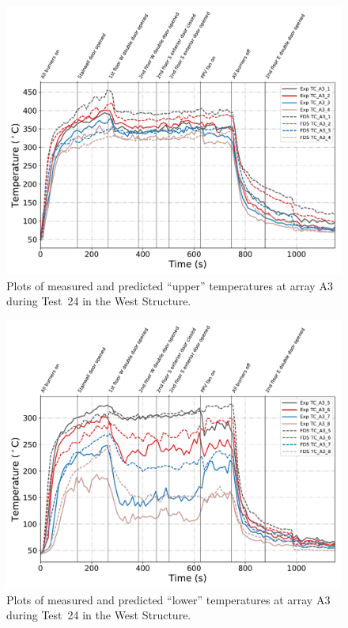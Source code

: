 \begin{figure}[!h]
	\centering
	\includegraphics[width=\columnwidth]{Figures/Plots/Validation/Temperature/Test_24_TC_A3_upper}
	\caption{Plots of measured and predicted ``upper'' temperatures at array A3 during Test~24 in the West Structure.}
	\label{fig:TCA3_upper_data_Test24}
\end{figure}
\begin{figure}[!h]
	\centering
	\includegraphics[width=\columnwidth]{Figures/Plots/Validation/Temperature/Test_24_TC_A3_lower}
	\caption{Plots of measured and predicted ``lower'' temperatures at array A3 during Test~24 in the West Structure.}
	\label{fig:TCA3_lower_data_Test24}
\end{figure}

